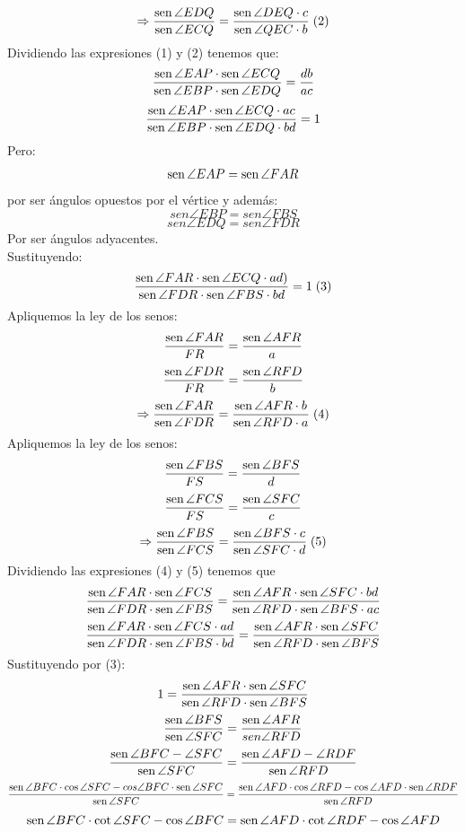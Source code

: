 \documentclass{book}
\newcommand{\sen}{\mathop{\rm sen}\nolimits} %
\begin{document}
\begin{enumerate}
        $$\Rightarrow{\sen {\angle EDQ}\over\sen {\angle ECQ}}={\sen {\angle DEQ}\cdot c\over\sen {\angle QEC}\cdot b}\;  (2)$$
        Dividiendo las expresiones (1) y (2) tenemos que:
        $$\frac{\sen {\angle EAP}\cdot\sen {\angle ECQ}}{\sen {\angle EBP}\cdot\sen {\angle EDQ}}={db\over ac}  $$
        $$\frac{\sen {\angle EAP}\cdot\sen {\angle ECQ}\cdot ac}{\sen {\angle EBP}\cdot\sen {\angle EDQ}\cdot bd}=1$$
        Pero:
        $$\sen {\angle EAP}=\sen {\angle FAR}$$
        por ser ángulos opuestos por el vértice y además:
        $$sen {\angle EBP}=sen {\angle FBS}$$
        $$sen {\angle EDQ}=sen {\angle FDR}$$
        Por ser ángulos adyacentes.\\
        Sustituyendo:
        $$\frac{\sen {\angle FAR}\cdot\sen {\angle ECQ}\cdot ad)}{\sen {\angle FDR}\cdot\sen {\angle FBS}\cdot bd}=1\; (3)$$
        Apliquemos la ley de los senos:
        $${\sen {\angle FAR}\over FR}={\sen {\angle AFR}\over a}$$
        $${\sen {\angle FDR}\over FR}={\sen {\angle RFD}\over b}$$
        $$\Rightarrow\frac{\sen {\angle FAR}}{\sen {\angle FDR}}=\frac{\sen {\angle AFR}\cdot b}{\sen {\angle RFD}\cdot a}\;(4)$$
        Apliquemos la ley de los senos:
        $${\sen {\angle FBS}\over FS}={\sen {\angle BFS}\over d}$$
        $${\sen {\angle FCS}\over FS}={\sen {\angle SFC}\over c}$$
        $$\Rightarrow\frac{\sen {\angle FBS}}{\sen {\angle FCS}}=\frac{\sen {\angle BFS}\cdot c}{\sen {\angle SFC}\cdot d}\;(5)$$
        Dividiendo las expresiones (4) y (5) tenemos que
        $$\frac{\sen {\angle FAR}\cdot\sen {\angle FCS}}{\sen {\angle FDR}\cdot\sen {\angle FBS}}=\frac{\sen {\angle AFR}\cdot\sen {\angle SFC}\cdot bd}{\sen {\angle RFD}\cdot\sen {\angle BFS}\cdot ac}$$
        $$\frac{\sen {\angle FAR}\cdot\sen {\angle FCS}\cdot ad}{\sen {\angle FDR}\cdot\sen {\angle FBS}\cdot bd}=\frac{\sen {\angle AFR}\cdot\sen {\angle SFC}}{\sen {\angle RFD}\cdot\sen {\angle BFS}}$$
        Sustituyendo por (3):
        $$1=\frac{\sen {\angle AFR}\cdot\sen {\angle SFC}}{\sen {\angle RFD}\cdot\sen {\angle BFS}}$$
        $$\frac{\sen {\angle BFS}}{\sen {\angle SFC}}=\frac{\sen {\angle AFR}}{
            sen {\angle RFD}}$$
        $$\frac{\sen {\angle BFC-\angle SFC}}{\sen {\angle SFC}}=\frac{\sen {\angle AFD-\angle RDF}}{\sen {\angle RFD}}$$
        $$\frac{\sen{\angle BFC}\cdot\cos{\angle SFC}-cos{\angle BFC}\cdot\sen {\angle SFC}}{\sen{\angle SFC}}=\frac{\sen{\angle AFD}\cdot\cos{\angle RFD}-\cos{\angle AFD}\cdot\sen{\angle RDF}}{\sen{\angle RFD}}$$
        $$\sen {\angle BFC}\cdot\cot{\angle SFC}-\cos{\angle BFC}=\sen {\angle AFD}\cdot\cot{\angle RDF}-\cos{\angle AFD}$$

\end{enumerate}
\end{document}
